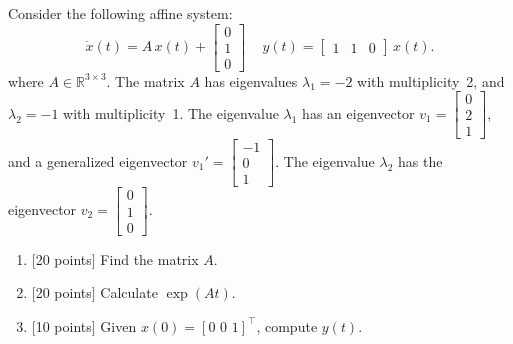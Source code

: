 \documentclass[a4paper,10.5pt]{article}
\newcommand{\R}{\mathbb{R}}
\begin{document}
Consider the following affine system:
\begin{equation*}
  \dot{x}(t) = A\, x(t) + 
  \begin{bmatrix}
0\\ 1\\ 0\end{bmatrix}\, \quad
  y(t) = \begin{bmatrix}1 & 1 & 0\end{bmatrix}\, x(t).
\end{equation*}
where $A \in \R^{3 \times 3}$.
The matrix $A$ has eigenvalues $\lambda_1 = -2$ with multiplicity~2, and $\lambda_2 = -1$ with multiplicity~1.
The eigenvalue $\lambda_1$ has an eigenvector $v_1 = \begin{bmatrix}0\\ 2\\ 1\end{bmatrix}$, and a generalized eigenvector $v_1' = \begin{bmatrix}-1\\ 0\\ 1\end{bmatrix}$.
The eigenvalue $\lambda_2$ has the eigenvector $v_2 = \begin{bmatrix}0\\ 1\\ 0\end{bmatrix}$.
\begin{enumerate}
	\item $[$20 points$]$ Find the matrix $A$.
	\item $[$20 points$]$ Calculate $\exp(At)$.
	\item $[$10 points$]$ Given $x(0)=[0\,\,0\,\,1]^{\top}$, compute $y(t)$.
\end{enumerate}
\end{document}
